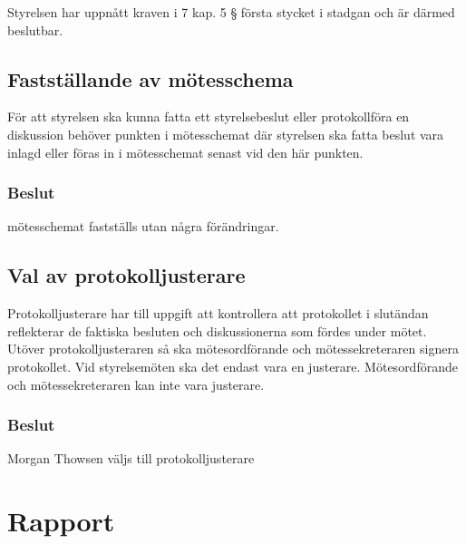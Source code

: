 \documentclass[protokoll]{dvd}
\begin{document}
\begin{attsatser}
    \item Styrelsen har uppnått kraven i 7 kap.
          5 § första stycket i stadgan och är därmed beslutbar.
\end{attsatser}

\subsection{Fastställande av mötesschema}

För att styrelsen ska kunna fatta ett styrelsebeslut eller protokollföra en diskussion
behöver punkten i mötesschemat där styrelsen ska fatta beslut
vara inlagd eller föras in i mötesschemat senast vid den här punkten.

\subsubsection*{Beslut}

\begin{attsatser}
    \item mötesschemat fastställs utan några förändringar.
\end{attsatser}

\subsection{Val av protokolljusterare}

Protokolljusterare har till uppgift att kontrollera att protokollet
i slutändan reflekterar de faktiska besluten och diskussionerna som fördes under mötet.
Utöver protokolljusteraren så ska mötesordförande och mötessekreteraren signera protokollet.
Vid styrelsemöten ska det endast vara en justerare.
Mötesordförande och mötessekreteraren kan inte vara justerare.

\subsubsection*{Beslut}
\begin{attsatser}
    \item Morgan Thowsen väljs till protokolljusterare
\end{attsatser}

\newpage

\section{Rapport}
\end{document}

